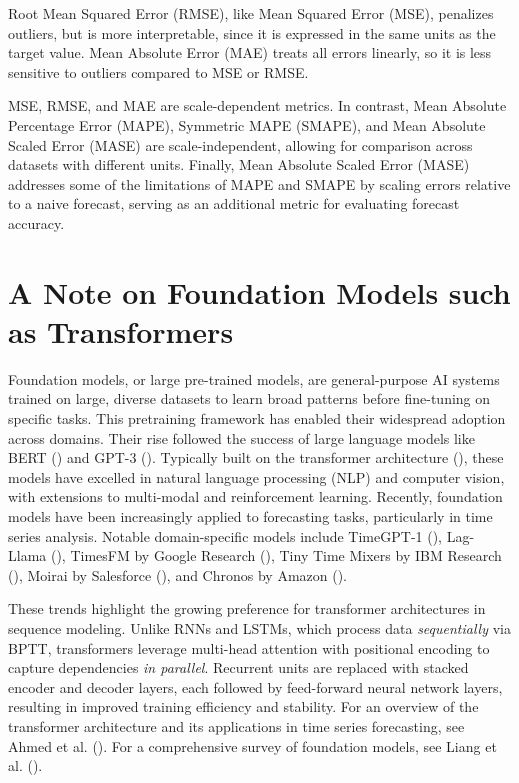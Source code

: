 \documentclass[
  letterpaper,
  double,
  12pt,
  1.0in]{beavtex}
\begin{document}
Root Mean Squared Error (RMSE), like Mean Squared Error (MSE), penalizes
outliers, but is more interpretable, since it is expressed in the same
units as the target value. Mean Absolute Error (MAE) treats all errors
linearly, so it is less sensitive to outliers compared to MSE or RMSE.

MSE, RMSE, and MAE are scale-dependent metrics. In contrast, Mean
Absolute Percentage Error (MAPE), Symmetric MAPE (SMAPE), and Mean
Absolute Scaled Error (MASE) are scale-independent, allowing for
comparison across datasets with different units. Finally, Mean Absolute
Scaled Error (MASE) addresses some of the limitations of MAPE and SMAPE
by scaling errors relative to a naive forecast, serving as an additional
metric for evaluating forecast accuracy.

\section{A Note on Foundation Models such as
Transformers}\label{a-note-on-foundation-models-such-as-transformers}

Foundation models, or large pre-trained models, are general-purpose AI
systems trained on large, diverse datasets to learn broad patterns
before fine-tuning on specific tasks. This pretraining framework has
enabled their widespread adoption across domains. Their rise followed
the success of large language models like BERT
() and GPT-3
(). Typically built
on the transformer architecture
(), these models
have excelled in natural language processing (NLP) and computer vision,
with extensions to multi-modal and reinforcement learning. Recently,
foundation models have been increasingly applied to forecasting tasks,
particularly in time series analysis. Notable domain-specific models
include TimeGPT-1 (), Lag-Llama
(), TimesFM by Google
Research (), Tiny Time Mixers by IBM Research
(),
Moirai by Salesforce (),
and Chronos by Amazon ().

These trends highlight the growing preference for transformer
architectures in sequence modeling. Unlike RNNs and LSTMs, which process
data \emph{sequentially} via BPTT, transformers leverage multi-head
attention with positional encoding to capture dependencies \emph{in
parallel}. Recurrent units are replaced with stacked encoder and decoder
layers, each followed by feed-forward neural network layers, resulting
in improved training efficiency and stability. For an overview of the
transformer architecture and its applications in time series
forecasting, see Ahmed et al.
(). For a
comprehensive survey of foundation models, see Liang et al.
().
\end{document}
